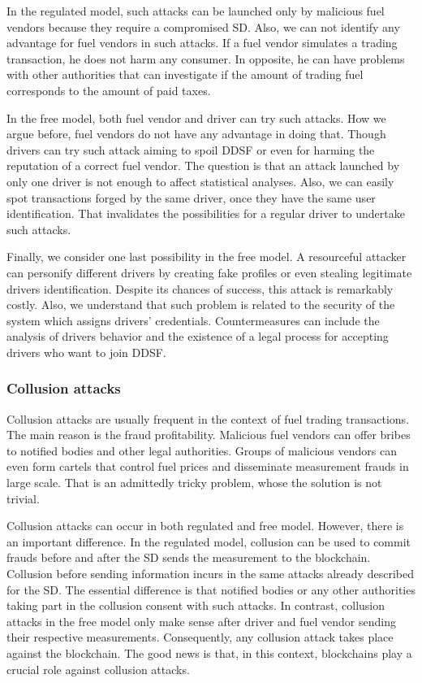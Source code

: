 \documentclass[sigplan]{acmart}
\begin{document}
In the regulated model, such attacks can be launched only by malicious fuel vendors because they require a compromised SD.
Also, we can not identify any advantage for fuel vendors in such attacks.
If a fuel vendor simulates a trading transaction, he does not harm any consumer.
In opposite, he can have problems with other authorities that can investigate if the amount of trading fuel corresponds to the amount of paid taxes.

In the free model, both fuel vendor and driver can try such attacks.
How we argue before, fuel vendors do not have any advantage in doing that.
Though drivers can try such attack aiming to spoil DDSF or even for harming the reputation of a correct fuel vendor.
The question is that an attack launched by only one driver is not enough to affect statistical analyses.
Also, we can easily spot transactions forged by the same driver, once they have the same user identification.
That invalidates the possibilities for a regular driver to undertake such attacks.

Finally, we consider one last possibility in the free model.
A resourceful attacker can personify different drivers by creating fake profiles or even stealing legitimate drivers identification.
Despite its chances of success, this attack is remarkably costly.
Also, we understand that such problem is related to the security of the system which assigns drivers' credentials.
Countermeasures can include the analysis of drivers behavior and the existence of a legal process for accepting drivers who want to join DDSF.

\subsubsection{Collusion attacks}
Collusion attacks are usually frequent in the context of fuel trading transactions.
The main reason is the fraud profitability.
Malicious fuel vendors can offer bribes to notified bodies and other legal authorities.
Groups of malicious vendors can even form cartels that control fuel prices and disseminate measurement frauds in large scale.
That is an admittedly tricky problem, whose the solution is not trivial.

Collusion attacks can occur in both regulated and free model.
However, there is an important difference.
In the regulated model, collusion can be used to commit frauds before and after the SD sends the measurement to the blockchain.
Collusion before sending information incurs in the same attacks already described for the SD.
The essential difference is that notified bodies or any other authorities taking part in the collusion consent with such attacks.
In contrast, collusion attacks in the free model only make sense after driver and fuel vendor sending their respective measurements.
Consequently, any collusion attack takes place against the blockchain.
The good news is that, in this context, blockchains play a crucial role against collusion attacks.
\end{document}
